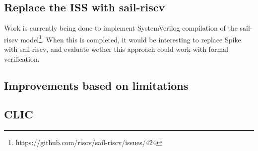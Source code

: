 \subsection{Replace the ISS with sail-riscv}

Work is currently being done to implement SystemVerilog compilation of the sail-riscv model\footnote{https://github.com/riscv/sail-riscv/issues/424}. When this is completed, it would be interesting to replace Spike with sail-riscv, and evaluate wether this approach could work with formal verification. 

\subsection{Improvements based on limitations}


\subsection{CLIC}

